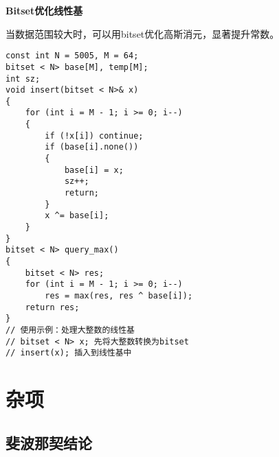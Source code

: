 \documentclass[a4paper,fontset=none]{ctexart}
\begin{document}
\textbf{Bitset优化线性基}

当数据范围较大时，可以用bitset优化高斯消元，显著提升常数。

\begin{verbatim}
const int N = 5005, M = 64;
bitset < N> base[M], temp[M];
int sz;
void insert(bitset < N>& x)
{
    for (int i = M - 1; i >= 0; i--)
    {
        if (!x[i]) continue;
        if (base[i].none())
        {
            base[i] = x;
            sz++;
            return;
        }
        x ^= base[i];
    }
}
bitset < N> query_max()
{
    bitset < N> res;
    for (int i = M - 1; i >= 0; i--)
        res = max(res, res ^ base[i]);
    return res;
}
// 使用示例：处理大整数的线性基
// bitset < N> x; 先将大整数转换为bitset
// insert(x); 插入到线性基中
\end{verbatim}

\section{杂项}
\subsection{斐波那契结论}
\end{document}

